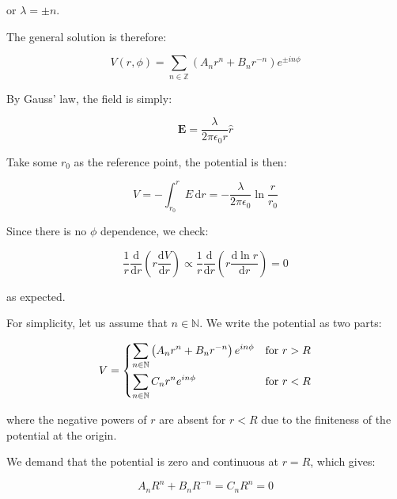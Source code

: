 \documentclass[12pt]{article}
\begin{document}
or $\lambda = \pm n$.

The general solution is therefore:

\begin{equation}
    V(r, \phi) = \sum_{n \in \mathbb{Z}} \left( A_{n} r^{n} + B_{n} r^{-n} \right) e^{\pm in\phi}
\end{equation}

By Gauss' law, the field is simply:

\begin{equation}
    \mathbf{E} = \frac{\lambda}{2\pi\epsilon_{0}r} \hat{r}
\end{equation}

Take some $r_{0}$ as the reference point, the potential is then:

\begin{equation}
    V = -\int_{r_{0}}^{r} E \, \mathrm{d}r = -\frac{\lambda}{2\pi\epsilon_{0}} \ln{\frac{r}{r_{0}}}
\end{equation}

Since there is no $\phi$ dependence, we check:

\begin{equation}
    \frac{1}{r} \frac{\mathrm{d}}{\mathrm{d}r} \left( r \frac{\mathrm{d}V}{\mathrm{d}r} \right) \propto \frac{1}{r} \frac{\mathrm{d}}{\mathrm{d}r} \left( r \frac{\mathrm{d}\ln{r}}{\mathrm{d}r} \right) = 0
\end{equation}

as expected.

For simplicity, let us assume that $n \in \mathbb{N}$. We write the potential as two parts:

\begin{equation}
V =
\begin{dcases}
    \sum_{n \in \mathbb{N}} \left( A_{n} r^{n} + B_{n} r^{-n} \right) e^{in\phi} & \text{for } r > R \\
    \sum_{n \in \mathbb{N}} C_{n} r^{n} e^{in\phi} & \text{for } r < R
\end{dcases}
\end{equation}

where the negative powers of $r$ are absent for $r < R$ due to the finiteness of the potential at the origin.

We demand that the potential is zero and continuous at $r = R$, which gives:

\begin{equation}
    A_{n} R^{n} + B_{n} R^{-n} = C_{n} R^{n} = 0
\end{equation}
\end{document}
